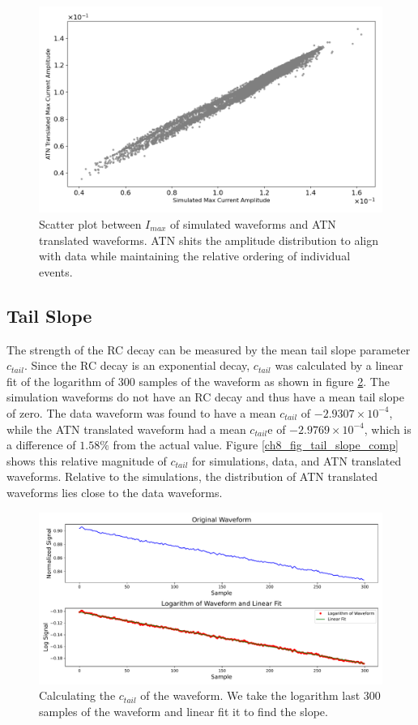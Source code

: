 \begin{figure}%
\centering
\includegraphics[width=0.9\linewidth,trim={0pc 0pc 0pc 0pc},clip]{ch8/figs/SEP_scatter_current_amplitude.png}
\caption{Scatter plot between $I_{max}$ of simulated waveforms and ATN translated waveforms. ATN shits the amplitude distribution to align with data while maintaining the relative ordering of individual events.}
\label{fig:current_amp}
\end{figure}


\subsection{Tail Slope}
The strength of the RC decay can be measured by the mean tail slope parameter $c_{tail}$. Since the RC decay is an exponential decay, $c_{tail}$ was calculated by a linear fit of the logarithm of 300 samples of the waveform as shown in figure \ref{ch8_fig_tail_slope_calc}. The simulation waveforms do not have an RC decay and thus have a mean tail slope of zero. The data waveform was found to have a mean $c_{tail}$ of $-2.9307\times10^{-4}$, while the ATN translated waveform had a mean $c_{tail}$e of $-2.9769\times10^{-4}$, which is a difference of $1.58\%$ from the actual value. Figure \ref{ch8_fig_tail_slope_comp} shows this relative magnitude of $c_{tail}$ for simulations, data, and ATN translated waveforms. Relative to the simulations, the distribution of ATN translated waveforms lies close to the data waveforms.

\begin{figure}%
    \centering
    \includegraphics[width=0.99\linewidth, trim={0.4cm 0pc 0.3cm 0cm},clip]{ch8/figs/tail_slope_calc.pdf}
    \caption{Calculating the $c_{tail}$ of the waveform. We take the logarithm last 300 samples of the waveform and linear fit it to find the slope.}
    \label{ch8_fig_tail_slope_calc}
\end{figure}

